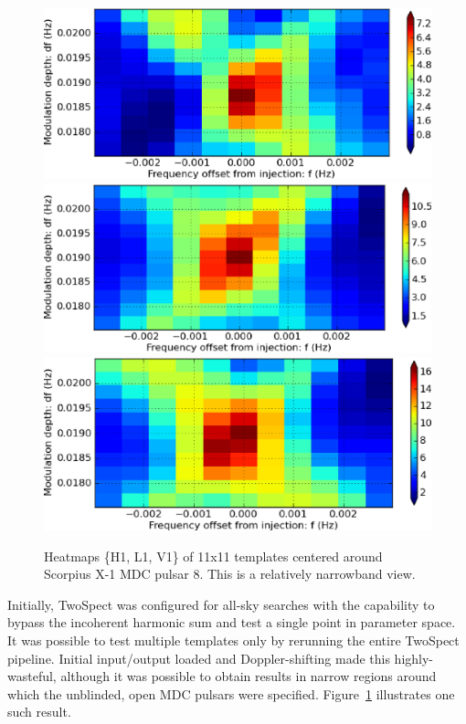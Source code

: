 \begin{figure}
\begin{center}
\includegraphics[width=0.6\paperwidth,height=0.2\paperheight]{heatmapH1.eps}
\includegraphics[width=0.6\paperwidth,height=0.2\paperheight]{heatmapL1.eps}
\includegraphics[width=0.6\paperwidth,height=0.2\paperheight]{heatmapV1.eps}
\caption{Heatmaps \{H1, L1, V1\} of 11x11 templates centered around
Scorpius X-1 MDC pulsar 8. 
This is a relatively narrowband view.
}
\label{scox1-narrow-heatmap-008}
\end{center}
\end{figure}

Initially, TwoSpect was configured for all-sky searches with the capability to bypass the incoherent harmonic sum and test a single point in parameter space.
It was possible to test multiple templates only by rerunning the entire TwoSpect pipeline.
Initial input/output loaded and Doppler-shifting made this highly-wasteful, although it was possible to obtain results in narrow regions around which the unblinded, open MDC pulsars were specified.
Figure~\ref{scox1-narrow-heatmap-008} illustrates one such result.


